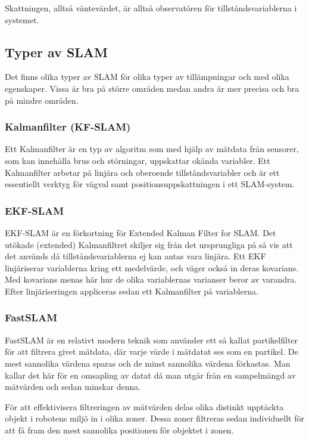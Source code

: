 \documentclass[a4paper,12pt,fleqn]{article}
\begin{document}
Skattningen, alltså väntevärdet, är alltså observatören för tillståndsvariablerna i systemet. 

\newpage
\subsection{Typer av SLAM}
Det finns olika typer av SLAM för olika typer av tillämpningar och med olika egenskaper. Vissa är bra på större områden medan andra är mer precisa och bra på mindre områden. 

\subsubsection{Kalmanfilter (KF-SLAM)}
Ett Kalmanfilter är en typ av algoritm som med hjälp av mätdata från sensorer, som kan innehålla brus och störningar, uppskattar okända variabler. Ett Kalmanfilter arbetar på linjära och oberoende tillståndsvariabler och är ett essentiellt verktyg för vägval samt positionsuppskattningen i ett SLAM-system. 

\subsubsection{EKF-SLAM} 
EKF-SLAM är en förkortning för Extended Kalman Filter for SLAM. Det utökade (extended) Kalmanfiltret skiljer sig från det ursprungliga på så vis att det används då tillståndsvariablerna ej kan antas vara linjära. Ett EKF linjäriserar variablerna kring ett medelvärde, och väger också in deras kovarians. Med kovarians menas här hur de olika variablernas varianser beror av varandra. Efter linjäriseringen appliceras sedan ett Kalmanfilter på variablerna.

\subsubsection{FastSLAM}
FastSLAM är en relativt modern teknik som använder ett så kallat partikelfilter för att filtrera givet mätdata, där varje värde i mätdatat ses som en partikel. De mest sannolika värdena sparas och de minst sannolika värdena förkastas. Man kallar det här för en omsapling av datat då man utgår från en sampelmängd av mätvärden och sedan minskar denna. 

För att effektivisera filtreringen av mätvärden delas olika distinkt upptäckta objekt i robotens miljö in i olika zoner. Dessa zoner filtreras sedan individuellt för att få fram den mest sannolika positionen för objektet i zonen. 
\end{document}
